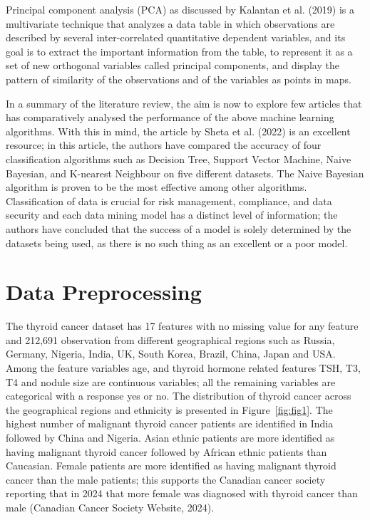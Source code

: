 \documentclass[11pt,a4paper]{article}
\begin{document}
Principal component analysis (PCA) as discussed by Kalantan et al. (2019) is a multivariate technique that analyzes a data table in which observations are described by several inter-correlated quantitative dependent variables, and its goal is to extract the important information from the table, to represent it as a set of new orthogonal variables called principal components, and display the pattern of similarity of the observations and of the variables as points in maps. 

In a summary of the literature review, the aim is now to explore few articles that has comparatively analysed the performance of the above machine learning algorithms. With this in mind, the article by Sheta et al. (2022) is an excellent resource; in this article, the authors have compared the accuracy of four classification algorithms such as Decision Tree, Support Vector Machine, Naive Bayesian, and K-nearest Neighbour on five different datasets. The Naive Bayesian algorithm is proven to be the most effective among other algorithms. Classification of data is crucial for risk management, compliance, and data security and each data mining model has a distinct level of information; the authors have concluded that the success of a model is solely determined by the datasets being used, as there is no such thing as an excellent or a poor model.
 

\section{Data Preprocessing}
The thyroid cancer dataset has 17 features with no missing value for any feature and 212,691 observation from different geographical regions such as Russia, Germany, Nigeria, India, UK, South Korea, Brazil, China, Japan and USA. Among the feature variables age, and thyroid hormone related features TSH, T3, T4 and nodule size are continuous variables; all the remaining variables are categorical with a response yes or no. The distribution of thyroid cancer across the geographical regions and ethnicity is presented in Figure~\ref{fig:fig1}. The highest number of malignant thyroid cancer patients are identified in India followed by China and Nigeria. Asian ethnic patients are more identified as having malignant thyroid cancer followed by African ethnic patients than Caucasian. Female patients are more identified as having malignant thyroid cancer than the male patients; this supports the Canadian cancer society reporting that in 2024 that more female was diagnosed with thyroid cancer than male (Canadian Cancer Society Website, 2024). 
\end{document}
